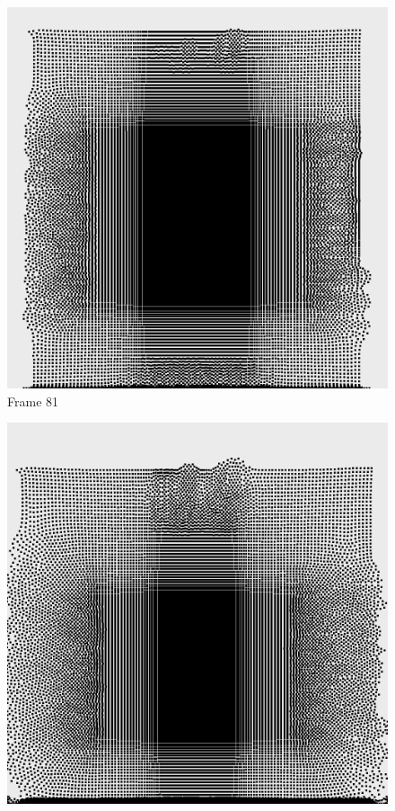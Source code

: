 \documentclass[a4paper, 12pt, oneside]{book}
\begin{document}
\begin{figure}[!ht]
    \addvspace{0.5ex}
        \begin{center}
            \includegraphics[width=\linewidth]{images/test_case_1/81.png}
            Frame 81
        \end{center}
    \endminipage
    \hfill
        \begin{center}
            \includegraphics[width=\linewidth]{images/test_case_1/101.png}

\end{center}
\end{figure}
\end{document}
